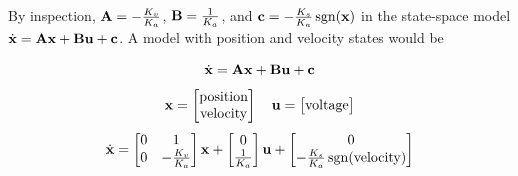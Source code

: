 By inspection, $\mathbf{A} = -\frac{K_v}{K_a}$, $\mathbf{B} = \frac{1}{K_a}$, and
$\mathbf{c} = -\frac{K_s}{K_a}\operatorname{sgn}(\mathbf{x})$ in the state-space model
$\dot{\mathbf{x}} = \mathbf{A}\mathbf{x} + \mathbf{B}\mathbf{u} + \mathbf{c}$. A model with
position and velocity states would be
\begin{theorem}
  \label{thm:1-dof_position_model}
  \begin{equation*}
    \dot{\mathbf{x}} = \mathbf{A}\mathbf{x} + \mathbf{B}\mathbf{u} + \mathbf{c}
  \end{equation*}
  \begin{equation*}
    \mathbf{x} =
    \begin{bmatrix}
      \text{position} \\
      \text{velocity}
    \end{bmatrix}
    \quad
    \mathbf{u} =
    \begin{bmatrix}
      \text{voltage}
    \end{bmatrix}
  \end{equation*}
  \begin{equation}
    \dot{\mathbf{x}} =
    \begin{bmatrix}
      0 & 1 \\
      0 & -\frac{K_v}{K_a}
    \end{bmatrix}
    \mathbf{x} +
    \begin{bmatrix}
      0 \\
      \frac{1}{K_a}
    \end{bmatrix}
    \mathbf{u} +
    \begin{bmatrix}
      0 \\
      -\frac{K_s}{K_a}\operatorname{sgn}(\text{velocity})
    \end{bmatrix}
  \end{equation}
\end{theorem}

